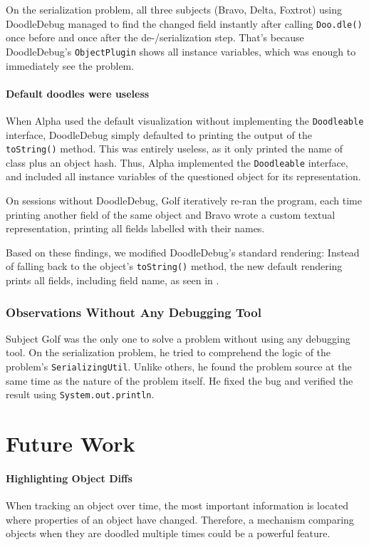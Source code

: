 \documentclass[english]{scrartcl}
\newcommand{\DD}{Dood\-le\-De\-bug\xspace}
\newcommand{\println}{\texttt{Sys\-tem.\-out.\-println}\xspace}
\begin{document}
On the serialization problem, all three subjects (Bravo, Delta, Foxtrot) using \DD managed to find the changed field instantly after calling \texttt{Doo.dle()} once before and once after the de-/serialization step. That's because \DD's \texttt{ObjectPlugin} shows all instance variables, which was enough to immediately see the problem.

\paragraph{Default doodles were useless}
When Alpha used the default visualization without implementing the \texttt{Doodleable} interface, \DD simply defaulted to printing
the output of the \texttt{toString()} method. This was entirely useless, as it only printed the name of class plus an object hash.
Thus, Alpha implemented the \texttt{Doodleable} interface, and included all instance variables of the questioned object for its representation.

On sessions without \DD, Golf iteratively re-ran the program, each time printing another field of the same object and Bravo wrote a custom textual representation, printing all fields labelled with their names.

Based on these findings, we modified \DD's standard rendering: Instead of falling back to the object's \texttt{toString()} method, the new default rendering prints all fields, including field name, as seen in .

\subsubsection{Observations Without Any Debugging Tool}
Subject Golf was the only one to solve a problem without using any debugging tool.
On the serialization problem, he tried to comprehend the logic of the problem's \texttt{SerializingUtil}.
Unlike others, he found the problem source at the same time as the nature of the problem itself.
He fixed the bug and verified the result using \println.


\section{Future Work}

\paragraph{Highlighting Object Diffs}
When tracking an object over time, the most important information is located where properties of an object have changed.
Therefore, a mechanism comparing objects when they are doodled multiple times could be a powerful feature.
\end{document}
